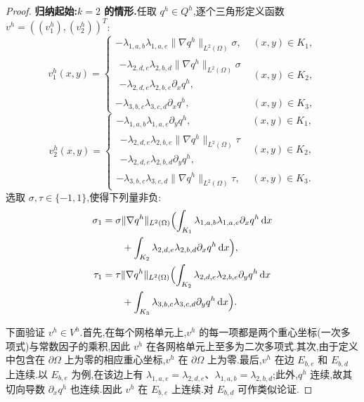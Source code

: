 \begin{proof}
\textbf{归纳起始:$k=2$ 的情形.}任取 $q^h\in Q^h$,逐个三角形定义函数 $v^h=((v_1^h),(v_2^h))^T$:
\[
v_1^h(x,y)=
\begin{cases}
 -\lambda_{1,a,b}\lambda_{1,a,e}\|\nabla q^h\|_{L^2(\Omega)}\sigma,&(x,y)\in K_1,\\
 \begin{aligned}
  -\lambda_{2,d,e}\lambda_{2,b,d}\|\nabla q^h\|_{L^2(\Omega)}\sigma\\[-.25em]
  -\lambda_{2,d,e}\lambda_{2,b,e}\partial_xq^h,
 \end{aligned}&(x,y)\in K_2,\\
 -\lambda_{3,b,c}\lambda_{3,c,d}\partial_xq^h,&(x,y)\in K_3,
\end{cases}
\]
\[
v_2^h(x,y)=
\begin{cases}
 -\lambda_{1,a,b}\lambda_{1,a,e}\partial_yq^h,&(x,y)\in K_1,\\
 \begin{aligned}
  -\lambda_{2,d,e}\lambda_{2,b,e}\|\nabla q^h\|_{L^2(\Omega)}\tau\\[-.25em]
  -\lambda_{2,d,e}\lambda_{2,b,d}\partial_yq^h,
 \end{aligned}&(x,y)\in K_2,\\
 -\lambda_{3,b,c}\lambda_{3,c,d}\|\nabla q^h\|_{L^2(\Omega)}\tau,&(x,y)\in K_3.
\end{cases}
\]
选取 $\sigma,\tau\in\{-1,1\}$,使得下列量非负:
\[
\begin{aligned}
  \sigma_1&=\sigma\|\nabla q^h\|_{L^2(\Omega)}\Bigl(
       \int_{K_1}\lambda_{1,a,b}\lambda_{1,a,e}\partial_xq^h\,\mathrm{d}x\\
       &\qquad+\int_{K_2}\lambda_{2,d,e}\lambda_{2,b,d}\partial_xq^h\,\mathrm{d}x\Bigr),\\
  \tau_1&=\tau\|\nabla q^h\|_{L^2(\Omega)}\Bigl(
       \int_{K_2}\lambda_{2,d,e}\lambda_{2,b,e}\partial_yq^h\,\mathrm{d}x\\
       &\qquad+\int_{K_3}\lambda_{3,b,c}\lambda_{3,c,d}\partial_yq^h\,\mathrm{d}x\Bigr).
\end{aligned}
\]

下面验证 $v^h\in V^h$.首先,在每个网格单元上,$v^h$ 的每一项都是两个重心坐标(一次多项式)与常数因子的乘积,因此 $v^h$ 在各网格单元上至多为二次多项式.其次,由于定义中包含在 $\partial\Omega$ 上为零的相应重心坐标,$v^h$ 在 $\partial\Omega$ 上为零.最后,$v^h$ 在边 $E_{b,e}$ 和 $E_{b,d}$ 上连续.以 $E_{b,e}$ 为例,在该边上有 $\lambda_{1,a,e}=\lambda_{2,d,e}$、$\lambda_{1,a,b}=\lambda_{2,b,d}$;此外,$q^h$ 连续,故其切向导数 $\partial_xq^h$ 也连续.因此 $v^h$ 在 $E_{b,e}$ 上连续.对 $E_{b,d}$ 可作类似论证.


\end{proof}
